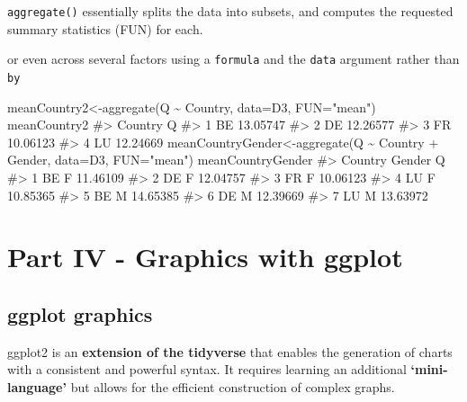 \documentclass[
  letterpaper,
  DIV=11,
  numbers=noendperiod]{scrreprt}
\newenvironment{Shaded}{\begin{snugshade}}{\end{snugshade}}
\newcommand{\AttributeTok}[1]{\textcolor[rgb]{0.40,0.45,0.13}{#1}}
\newcommand{\CommentTok}[1]{\textcolor[rgb]{0.37,0.37,0.37}{#1}}
\newcommand{\FunctionTok}[1]{\textcolor[rgb]{0.28,0.35,0.67}{#1}}
\newcommand{\NormalTok}[1]{\textcolor[rgb]{0.00,0.23,0.31}{#1}}
\newcommand{\OtherTok}[1]{\textcolor[rgb]{0.00,0.23,0.31}{#1}}
\newcommand{\SpecialCharTok}[1]{\textcolor[rgb]{0.37,0.37,0.37}{#1}}
\newcommand{\StringTok}[1]{\textcolor[rgb]{0.13,0.47,0.30}{#1}}
\begin{document}
\texttt{aggregate()} essentially splits the data into subsets, and
computes the requested summary statistics (FUN) for each.

or even across several factors using a \texttt{formula} and the
\texttt{data} argument rather than \texttt{by}

\begin{Shaded}
\begin{Highlighting}[]
\NormalTok{meanCountry2}\OtherTok{\textless{}{-}}\FunctionTok{aggregate}\NormalTok{(Q }\SpecialCharTok{\textasciitilde{}}\NormalTok{ Country, }\AttributeTok{data=}\NormalTok{D3, }\AttributeTok{FUN=}\StringTok{"mean"}\NormalTok{)}
\NormalTok{meanCountry2}
\CommentTok{\#\textgreater{}   Country        Q}
\CommentTok{\#\textgreater{} 1      BE 13.05747}
\CommentTok{\#\textgreater{} 2      DE 12.26577}
\CommentTok{\#\textgreater{} 3      FR 10.06123}
\CommentTok{\#\textgreater{} 4      LU 12.24669}
\NormalTok{meanCountryGender}\OtherTok{\textless{}{-}}\FunctionTok{aggregate}\NormalTok{(Q }\SpecialCharTok{\textasciitilde{}}\NormalTok{ Country }\SpecialCharTok{+}\NormalTok{ Gender, }\AttributeTok{data=}\NormalTok{D3, }\AttributeTok{FUN=}\StringTok{"mean"}\NormalTok{)}
\NormalTok{meanCountryGender}
\CommentTok{\#\textgreater{}   Country Gender        Q}
\CommentTok{\#\textgreater{} 1      BE      F 11.46109}
\CommentTok{\#\textgreater{} 2      DE      F 12.04757}
\CommentTok{\#\textgreater{} 3      FR      F 10.06123}
\CommentTok{\#\textgreater{} 4      LU      F 10.85365}
\CommentTok{\#\textgreater{} 5      BE      M 14.65385}
\CommentTok{\#\textgreater{} 6      DE      M 12.39669}
\CommentTok{\#\textgreater{} 7      LU      M 13.63972}
\end{Highlighting}
\end{Shaded}

\part{Part IV - Graphics with ggplot}

\chapter{ggplot graphics}\label{sec-introduction}

ggplot2 is an \textbf{extension of the tidyverse} that enables the
generation of charts with a consistent and powerful syntax. It requires
learning an additional \textbf{`mini-language'} but allows for the
efficient construction of complex graphs.
\end{document}
